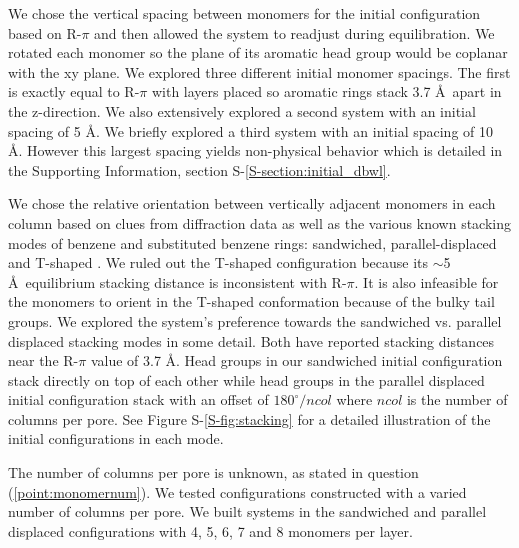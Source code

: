 \documentclass[journal=jpcbfk,manuscript=article]{achemso}
\begin{document}
  We chose the vertical spacing between monomers for the initial configuration based
  on R-$\pi$ and then allowed the system to readjust during equilibration. We rotated 
  each monomer so the plane of its aromatic head group would be coplanar with the xy plane. We
  explored three different initial monomer spacings. The first is exactly
  equal to R-$\pi$ with layers placed so aromatic rings stack 3.7 \AA~apart in
  the z-direction. We also extensively explored a second system with an initial spacing of 5
  \AA. We briefly explored a third system with an initial spacing of 10
  \AA. However this largest spacing yields non-physical behavior which is detailed in the 
  Supporting Information, section S-\ref{S-section:initial_dbwl}. 


  We chose the relative orientation between vertically adjacent monomers in each column 
  based on clues from diffraction data as well as the various known stacking modes of 
  benzene and substituted benzene rings: sandwiched, parallel-displaced and T-shaped
  \cite{sinnokrot_estimates_2002}. We ruled out the T-shaped configuration
  because its $\sim$5 \AA~equilibrium stacking distance \cite{sinnokrot_estimates_2002}
  is inconsistent with R-$\pi$. It is also infeasible for the monomers to orient in the 
  T-shaped conformation because of the bulky tail groups. We explored the system's 
  preference towards the sandwiched vs. parallel displaced stacking modes in some detail.
  Both have reported stacking distances near the R-$\pi$ value of 3.7 \AA. Head groups in
  our sandwiched initial configuration stack directly on top of each other while
  head groups in the parallel displaced initial configuration stack with an offset
  of $180^\circ/ncol$ where $ncol$ is the number of columns per pore. See Figure 
  S-\ref{S-fig:stacking} for a detailed illustration of the initial configurations in each mode.
  

  The number of columns per pore is unknown, as stated in question
  (\ref{point:monomernum}). We tested configurations constructed with a varied
  number of columns per pore. We built systems in the sandwiched and parallel
  displaced configurations with 4, 5, 6, 7 and 8 monomers per layer.
\end{document}

